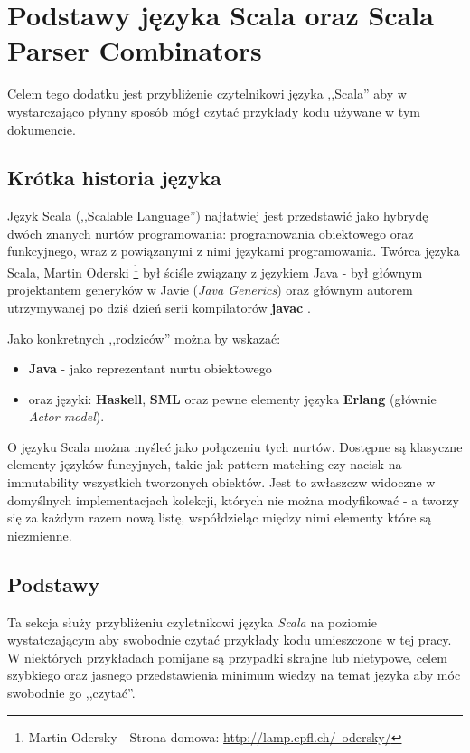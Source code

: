 \chapter{Podstawy języka Scala oraz Scala Parser Combinators}
\label{cha:appendixB}
Celem tego dodatku jest przybliżenie czytelnikowi języka ,,Scala'' aby w wystarczająco płynny sposób mógł czytać przykłady kodu używane w tym dokumencie.

\section{Krótka historia języka}
\label{sec:scala_history}
Język Scala (,,Scalable Language'') najłatwiej jest przedstawić jako hybrydę dwóch znanych nurtów programowania: programowania obiektowego oraz funkcyjnego, wraz z 
powiązanymi z nimi językami programowania. Twórca języka Scala, Martin Oderski \footnote{Martin Odersky - Strona domowa: \href{http://lamp.epfl.ch/~odersky/}{http://lamp.epfl.ch/~odersky/}}
był ściśle związany z językiem Java - był głównym projektantem generyków w Javie (\textit{Java Generics}) oraz głównym autorem utrzymywanej po dziś dzień
serii kompilatorów \textbf{javac} \cite{OderskyWywiad}.

Jako konkretnych ,,rodziców'' można by wskazać: 
\begin{itemize}
 \item \textbf{Java} - jako reprezentant nurtu obiektowego 
 \item oraz języki: \textbf{Haskell}, \textbf{SML} oraz pewne elementy języka \textbf{Erlang} (głównie \textit{Actor model}).
\end{itemize}

O języku Scala można myśleć jako połączeniu tych nurtów. Dostępne są klasyczne elementy języków funcyjnych,
takie jak pattern matching czy nacisk na immutability wszystkich tworzonych obiektów. Jest to zwłaszczw widoczne w domyślnych implementacjach
kolekcji, których nie można modyfikować - a tworzy się za każdym razem nową listę, współdzieląc między nimi elementy które są niezmienne.

\section{Podstawy}
\label{sec:scala_basics}
Ta sekcja służy przybliżeniu czyletnikowi języka \textit{Scala} na poziomie wystatczającym aby swobodnie czytać przykłady
kodu umieszczone w tej pracy. W niektórych przykładach pomijane są przypadki skrajne lub nietypowe, celem szybkiego oraz 
jasnego przedstawienia minimum wiedzy na temat języka aby móc swobodnie go ,,czytać''.

